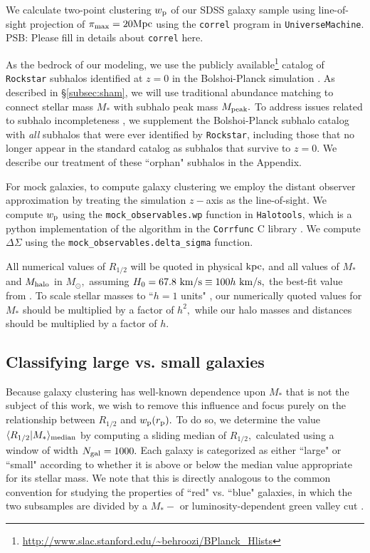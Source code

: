 \documentclass[usenatbib,usegraphicx,letterpaper]{mn2e}
\newcommand{\rhalf}{R_{1/2}}
\newcommand{\mstar}{M_{\ast}}
\newcommand{\mpeak}{M_{\rm peak}}
\newcommand{\mhalo}{M_{\rm halo}}
\newcommand{\rproj}{r_{\rm p}}
\newcommand{\wproj}{w_{\rm p}}
\newcommand{\median}[2]{\langle{#1}\vert{#2}\rangle_{\rm median}}
\newcommand{\kpc}{{\rm kpc}}
\newcommand{\mpc}{{\rm Mpc}}
\newcommand{\msun}{M_\odot}
\newcommand{\kms}{{\rm km/s}}
\begin{document}
We calculate two-point clustering $\wproj$ of our SDSS galaxy sample using line-of-sight projection of $\pi_{\rm max}=20\mpc$ using the {\tt correl} program in {\tt UniverseMachine}. {\color{red} PSB: Please fill in details about {\tt correl} here}.

As the bedrock of our modeling, we use the publicly available\footnote{\url{http://www.slac.stanford.edu/~behroozi/BPlanck\_Hlists}} catalog of {\tt Rockstar} subhalos identified at $z=0$ in the Bolshoi-Planck simulation \citep{klypin_etal11,behroozi12_rockstar,behroozi12_consistent_trees,riebe_etal13,rodriguez_puebla16_bolplanck}. As described in \S\ref{subsec:sham}, we will use traditional abundance matching to connect stellar mass $\mstar$ with subhalo peak mass $\mpeak.$ To address issues related to subhalo incompleteness \citep{guo_white13,campbell_etal17}, we supplement the Bolshoi-Planck subhalo catalog with {\em all} subhalos that were ever identified by {\tt Rockstar}, including those that no longer appear in the standard catalog as subhalos that survive to $z=0.$ We describe our treatment of these ``orphan" subhalos in the Appendix.

For mock galaxies, to compute galaxy clustering we employ the distant observer approximation by treating the simulation $z-$axis as the line-of-sight. We compute $\wproj$ using the {\tt mock\_observables.wp} function in {\tt Halotools}, which is a python implementation of the algorithm in the {\tt Corrfunc} C library \citep{sinha_etal17}. We compute $\Delta\Sigma$ using the {\tt mock\_observables.delta\_sigma} function.

All numerical values of $\rhalf$ will be quoted in physical $\kpc,$ and all values of $\mstar$ and $\mhalo$ in $\msun,$ assuming $H_0=67.8~\kms\equiv100h~\kms,$ the best-fit value from \citet{planck15}. To scale stellar masses to ``$h=1$ units" \citep{croton13}, our numerically quoted values for $\mstar$ should be multiplied by a factor of $h^2,$ while our halo masses and distances should be multiplied by a factor of $h.$

\subsection{Classifying large vs. small galaxies}
\label{subsec:sizedef}

Because galaxy clustering has well-known dependence upon $\mstar$ that is not the subject of this work, we wish to remove this influence and focus purely on the relationship between $\rhalf$ and $\wproj(\rproj).$ To do so, we determine the value $\median{\rhalf}{\mstar}$ by computing a sliding median of $\rhalf,$ calculated using a window of width $N_{\rm gal}=1000.$ Each galaxy is categorized as either ``large" or ``small" according to whether it is above or below the median value appropriate for its stellar mass. We note that this is directly analogous to the common convention for studying the properties of ``red" vs. ``blue" galaxies, in which the two subsamples are divided by a $\mstar-$ or luminosity-dependent green valley cut \citep[e.g.,][]{vdB_etal08,zehavi_etal11}.
\end{document}
